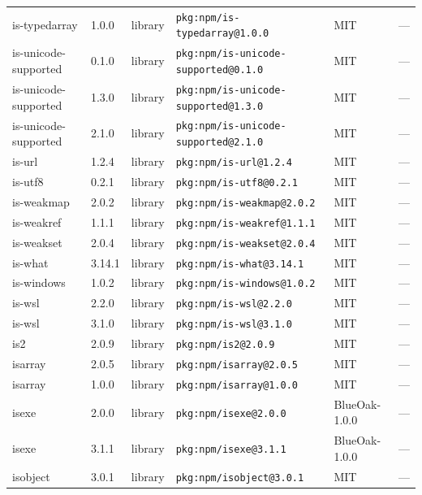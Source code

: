 \documentclass[11pt,a4paper]{article}
\begin{document}
\begin{longtable}{|p{4cm}|p{2cm}|p{1.6cm}|p{5cm}|p{1.5cm}|p{3.5cm}|}
\raggedright is-typedarray & 1.0.0 & library & \small\texttt{pkg:npm/is-typedarray@1.0.0} & MIT & \small — \\
\raggedright is-unicode-supported & 0.1.0 & library & \small\texttt{pkg:npm/is-unicode-supported@0.1.0} & MIT & \small — \\
\raggedright is-unicode-supported & 1.3.0 & library & \small\texttt{pkg:npm/is-unicode-supported@1.3.0} & MIT & \small — \\
\raggedright is-unicode-supported & 2.1.0 & library & \small\texttt{pkg:npm/is-unicode-supported@2.1.0} & MIT & \small — \\
\raggedright is-url & 1.2.4 & library & \small\texttt{pkg:npm/is-url@1.2.4} & MIT & \small — \\
\raggedright is-utf8 & 0.2.1 & library & \small\texttt{pkg:npm/is-utf8@0.2.1} & MIT & \small — \\
\raggedright is-weakmap & 2.0.2 & library & \small\texttt{pkg:npm/is-weakmap@2.0.2} & MIT & \small — \\
\raggedright is-weakref & 1.1.1 & library & \small\texttt{pkg:npm/is-weakref@1.1.1} & MIT & \small — \\
\raggedright is-weakset & 2.0.4 & library & \small\texttt{pkg:npm/is-weakset@2.0.4} & MIT & \small — \\
\raggedright is-what & 3.14.1 & library & \small\texttt{pkg:npm/is-what@3.14.1} & MIT & \small — \\
\raggedright is-windows & 1.0.2 & library & \small\texttt{pkg:npm/is-windows@1.0.2} & MIT & \small — \\
\raggedright is-wsl & 2.2.0 & library & \small\texttt{pkg:npm/is-wsl@2.2.0} & MIT & \small — \\
\raggedright is-wsl & 3.1.0 & library & \small\texttt{pkg:npm/is-wsl@3.1.0} & MIT & \small — \\
\raggedright is2 & 2.0.9 & library & \small\texttt{pkg:npm/is2@2.0.9} & MIT & \small — \\
\raggedright isarray & 2.0.5 & library & \small\texttt{pkg:npm/isarray@2.0.5} & MIT & \small — \\
\raggedright isarray & 1.0.0 & library & \small\texttt{pkg:npm/isarray@1.0.0} & MIT & \small — \\
\raggedright isexe & 2.0.0 & library & \small\texttt{pkg:npm/isexe@2.0.0} & BlueOak-1.0.0 & \small — \\
\raggedright isexe & 3.1.1 & library & \small\texttt{pkg:npm/isexe@3.1.1} & BlueOak-1.0.0 & \small — \\
\raggedright isobject & 3.0.1 & library & \small\texttt{pkg:npm/isobject@3.0.1} & MIT & \small — \\

\end{longtable}
\end{document}
